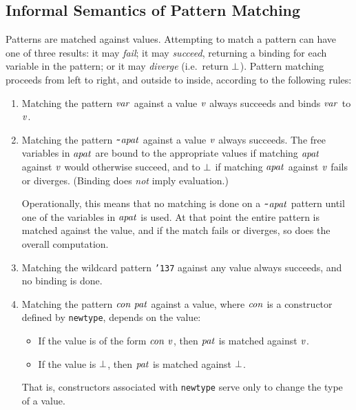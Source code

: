 
\subsection{Informal Semantics of Pattern Matching}

Patterns are matched against values.  Attempting to match a pattern
can have one of three results: it may {\em fail\/}; it may {\em
succeed}, returning a binding for each variable in the pattern; or it
may {\em diverge} (i.e.~return \mbox{$\it \bot$}).  Pattern matching proceeds
from left to right, and outside to inside, according to the following rules:
\begin{enumerate}
\item Matching the pattern \mbox{$\it var$} 
against a value \mbox{$\it v$} always succeeds and binds \mbox{$\it var$} to \mbox{$\it v$}.

\item
Matching the pattern \mbox{$\it \makebox{\tt {\char'176}}apat$} against a value \mbox{$\it v$} always succeeds.
The free variables in \mbox{$\it apat$} are bound to the appropriate values if matching
\mbox{$\it apat$} against \mbox{$\it v$} would otherwise succeed, and to \mbox{$\it \bot$} if matching
\mbox{$\it apat$} against \mbox{$\it v$} fails or diverges.  (Binding does {\em
not} imply evaluation.)

Operationally, this means that no matching is done on a
\mbox{$\it \makebox{\tt {\char'176}}apat$} pattern until one of the variables in \mbox{$\it apat$} is used.
At that point the entire pattern is matched against the value, and if
the match fails or diverges, so does the overall computation.

\item
Matching the wildcard pattern \mbox{\tt {\char'137}} against any value always succeeds,
and no binding is done.

\item
Matching the pattern \mbox{$\it con\ pat$} against a value, where \mbox{$\it con$} is a
constructor defined by \mbox{\tt newtype}, depends on the value:
\begin{itemize}
\item If the value is of the form \mbox{$\it con\ v$}, then \mbox{$\it pat$} is matched against \mbox{$\it v$}.
\item If the value is \mbox{$\it \bot$}, then \mbox{$\it pat$} is matched against \mbox{$\it \bot$}.
\end{itemize}
That is, constructors associated with
\mbox{\tt newtype} serve only to change the type of a value.


\end{enumerate}
